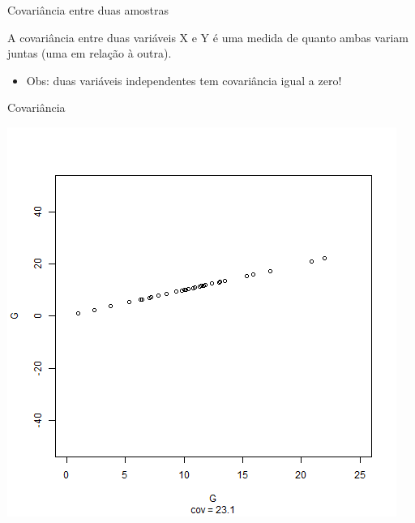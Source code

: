 \documentclass{beamer}
\begin{document}
\begin{frame}{Covariância entre duas amostras}
  \begin{definition}
    A covariância entre duas variáveis X e Y é uma medida de quanto
    ambas variam juntas (uma em relação à outra).
  \end{definition}
  \begin{itemize}
  \item Obs: duas variáveis independentes tem covariância igual a zero!
  \end{itemize}
\end{frame}

\begin{frame}{Covariância}
  \begin{center}
    \includegraphics[height=.8\textheight]{Cap17/anim-0}
  \end{center}
\end{frame}
\end{document}
